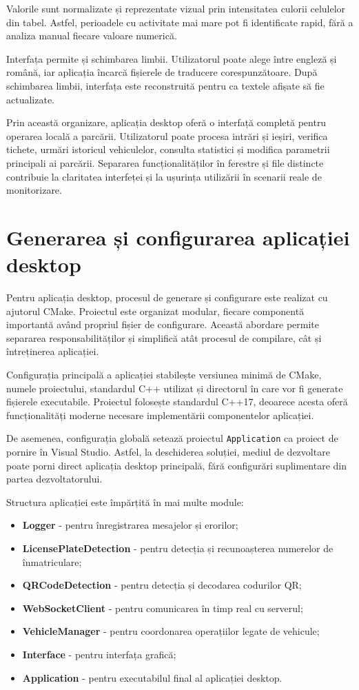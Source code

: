 Valorile sunt normalizate și reprezentate vizual prin intensitatea culorii celulelor din tabel. Astfel, perioadele cu activitate mai mare pot fi identificate rapid, fără a analiza manual fiecare valoare numerică.

Interfața permite și schimbarea limbii. Utilizatorul poate alege între engleză și română, iar aplicația încarcă fișierele de traducere corespunzătoare. După schimbarea limbii, interfața este reconstruită pentru ca textele afișate să fie actualizate.

Prin această organizare, aplicația desktop oferă o interfață completă pentru operarea locală a parcării. Utilizatorul poate procesa intrări și ieșiri, verifica tichete, urmări istoricul vehiculelor, consulta statistici și modifica parametrii principali ai parcării. Separarea funcționalităților în ferestre și file distincte contribuie la claritatea interfeței și la ușurința utilizării în scenarii reale de monitorizare.

\section{Generarea și configurarea aplicației desktop}

Pentru aplicația desktop, procesul de generare și configurare este realizat cu ajutorul CMake. Proiectul este organizat modular, fiecare componentă importantă având propriul fișier de configurare. Această abordare permite separarea responsabilităților și simplifică atât procesul de compilare, cât și întreținerea aplicației.

Configurația principală a aplicației stabilește versiunea minimă de CMake, numele proiectului, standardul C++ utilizat și directorul în care vor fi generate fișierele executabile. Proiectul folosește standardul C++17, deoarece acesta oferă funcționalități moderne necesare implementării componentelor aplicației.

De asemenea, configurația globală setează proiectul \texttt{Application} ca proiect de pornire în Visual Studio. Astfel, la deschiderea soluției, mediul de dezvoltare poate porni direct aplicația desktop principală, fără configurări suplimentare din partea dezvoltatorului.

Structura aplicației este împărțită în mai multe module:
\begin{itemize}
    \item \textbf{Logger} - pentru înregistrarea mesajelor și erorilor;
    \item \textbf{LicensePlateDetection} - pentru detecția și recunoașterea numerelor de înmatriculare;
    \item \textbf{QRCodeDetection} - pentru detecția și decodarea codurilor QR;
    \item \textbf{WebSocketClient} - pentru comunicarea în timp real cu serverul;
    \item \textbf{VehicleManager} - pentru coordonarea operațiilor legate de vehicule;
    \item \textbf{Interface} - pentru interfața grafică;
    \item \textbf{Application} - pentru executabilul final al aplicației desktop.
\end{itemize}

